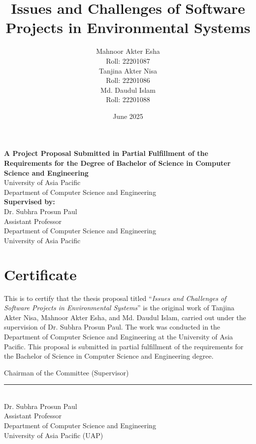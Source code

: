 \documentclass[12pt, a4paper]{article} %
\begin{document}
\title{\LARGE\textbf{Issues and Challenges of Software Projects in Environmental Systems}} %
\author{
Mahnoor Akter Esha \\ Roll: 22201087 \\
Tanjina Akter Nisa \\ Roll: 22201086 \\
Md. Daudul Islam \\ Roll: 22201088}
\date{June 2025}
\maketitle

\begin{center}
\textbf{A Project Proposal Submitted in Partial Fulfillment of the Requirements for the Degree of Bachelor of Science in Computer Science and Engineering} \\
\vspace{0.5em}
University of Asia Pacific \\
Department of Computer Science and Engineering \\
\vspace{0.5em}
\textbf{Supervised by:} \\
Dr. Subhra Prosun Paul \\
Assistant Professor \\
Department of Computer Science and Engineering \\
University of Asia Pacific
\end{center}

\clearpage
\section*{Certificate}
This is to certify that the thesis proposal titled ``\textit{Issues and Challenges of Software Projects in Environmental Systems}'' is the original work of Tanjina Akter Nisa, Mahnoor Akter Esha, and Md. Daudul Islam, carried out under the supervision of Dr. Subhra Prosun Paul. The work was conducted in the Department of Computer Science and Engineering at the University of Asia Pacific. This proposal is submitted in partial fulfillment of the requirements for the Bachelor of Science in Computer Science and Engineering degree.

\vspace{3em}
Chairman of the Committee (Supervisor) \\
\rule{0.5\textwidth}{0.4pt} \\
Dr. Subhra Prosun Paul \\
Assistant Professor \\
Department of Computer Science and Engineering \\
University of Asia Pacific (UAP)
\end{document}
